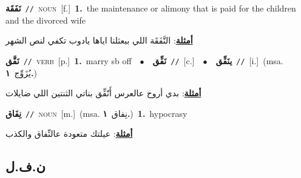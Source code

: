 \documentclass[10pt,a4paper,twoside]{article} %
\begin{document}
\begin{multicols}{2}
{\setlength\topsep{0pt}\textbf{\foreignlanguage{arabic}{نَفَقَة}}\ {\color{gray}\texttt{//}\color{black}}\ \textsc{noun}\ [f.]\ \textbf{1.}~the maintenance or alimony that is paid for the children and the divorced wife\  \begin{flushright}\color{gray}\foreignlanguage{arabic}{\textbf{\underline{\foreignlanguage{arabic}{أمثلة}}}: النَّفَقَة اللي ببعثلنا اياها يادوب تكفي لنص الشهر}\end{flushright}\color{black}} \vspace{2mm}

{\setlength\topsep{0pt}\textbf{\foreignlanguage{arabic}{نَفَّق}}\ {\color{gray}\texttt{//}\color{black}}\ \textsc{verb}\ [p.]\ \textbf{1.}~marry sb off\ \ $\bullet$\ \ \setlength\topsep{0pt}\textbf{\foreignlanguage{arabic}{نَفِّق}}\ {\color{gray}\texttt{//}\color{black}}\ [c.]\ \ $\bullet$\ \ \setlength\topsep{0pt}\textbf{\foreignlanguage{arabic}{ينَفِّق}}\ {\color{gray}\texttt{//}\color{black}}\ [i.]\ \color{gray}(msa. \foreignlanguage{arabic}{يُزَوِّج}~\foreignlanguage{arabic}{\textbf{١.}})\color{black}\  \begin{flushright}\color{gray}\foreignlanguage{arabic}{\textbf{\underline{\foreignlanguage{arabic}{أمثلة}}}: بدي أروح عالعرس أَنّفِّق بناتي الثنتين اللي ضايلات}\end{flushright}\color{black}} \vspace{2mm}

{\setlength\topsep{0pt}\textbf{\foreignlanguage{arabic}{نِفَاق}}\ {\color{gray}\texttt{//}\color{black}}\ \textsc{noun}\ [m.]\ \color{gray}(msa. \foreignlanguage{arabic}{نِفاق}~\foreignlanguage{arabic}{\textbf{١.}})\color{black}\ \textbf{1.}~hypocrasy\  \begin{flushright}\color{gray}\foreignlanguage{arabic}{\textbf{\underline{\foreignlanguage{arabic}{أمثلة}}}: عيلتك متعودة عالنِّفاق والكذب}\end{flushright}\color{black}} \vspace{2mm}

\vspace{-3mm}
\subsection*{\color{blue}\foreignlanguage{arabic}{ن.ف.ل}\color{blue}{}} 


\end{multicols}
\end{document}
